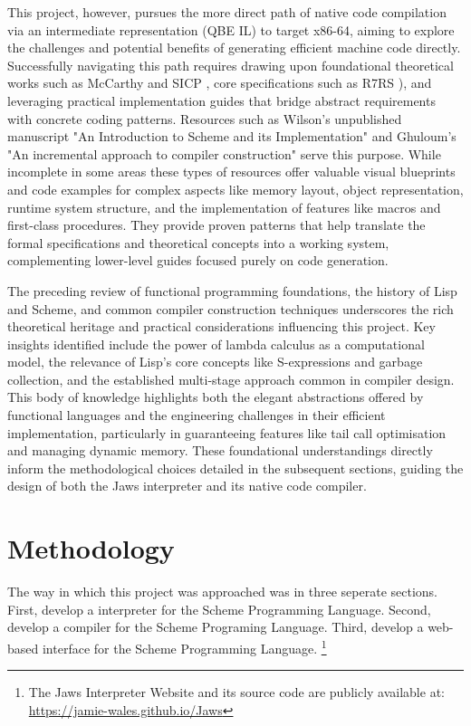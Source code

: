 \documentclass[final]{cmpreport_02}
\begin{document}
This project, however, pursues the more direct path of native code compilation via an intermediate representation (QBE IL) to target x86-64, aiming to explore the challenges and potential benefits of generating efficient machine code directly. Successfully navigating this path requires drawing upon foundational theoretical works such as McCarthy \cite{mccarthy1960recursive} and SICP \cite{structureandinterp}, core specifications such as R7RS \cite{r7rs}), and leveraging practical implementation guides that bridge abstract requirements with concrete coding patterns. Resources such as Wilson's unpublished manuscript \cite{wilson1996introduction} "An Introduction to Scheme and its Implementation" and Ghuloum's "An incremental approach to compiler construction" \cite{ghuloum2006incremental} serve this purpose. While incomplete in some areas these types of resources offer valuable visual blueprints and code examples for complex aspects like memory layout, object representation, runtime system structure, and the implementation of features like macros and first-class procedures. They provide proven patterns that help translate the formal specifications and theoretical concepts into a working system, complementing lower-level guides focused purely on code generation.
\newline

The preceding review of functional programming foundations, the history of Lisp and Scheme, and common compiler construction techniques underscores the rich theoretical heritage and practical considerations influencing this project. Key insights identified include the power of lambda calculus as a computational model, the relevance of Lisp's core concepts like S-expressions and garbage collection, and the established multi-stage approach common in compiler design. This body of knowledge highlights both the elegant abstractions offered by functional languages and the engineering challenges in their efficient implementation, particularly in guaranteeing features like tail call optimisation and managing dynamic memory. These foundational understandings directly inform the methodological choices detailed in the subsequent sections, guiding the design of both the Jaws interpreter and its native code compiler.
\section{Methodology}
The way in which this project was approached was in three seperate sections. First, develop a interpreter for the Scheme Programming Language. Second, develop a compiler for the Scheme Programing Language. Third, develop a web-based interface for the Scheme Programming Language. \footnote{The Jaws Interpreter Website and its source code are publicly available at: \url{https://jamie-wales.github.io/Jaws}} \newline
\end{document}
